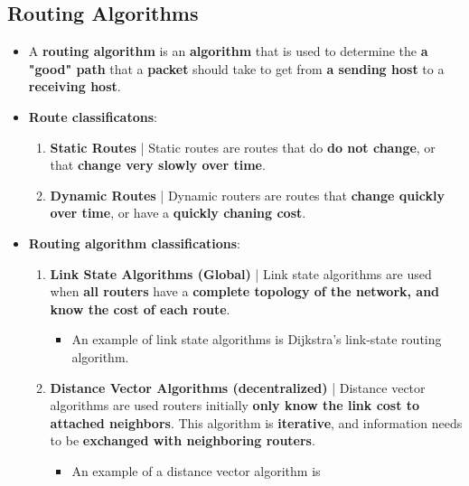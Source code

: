\documentclass{article}
\begin{document}
    \subsection*{Routing Algorithms}
    \begin{itemize}
        \item A \textbf{routing algorithm} is an \textbf{algorithm} that is used to determine the \textbf{a "good" path} that a \textbf{packet} should take to get from \textbf{a sending host} to a \textbf{receiving host}.
        \item \textbf{Route classificatons}:
        \begin{enumerate}
            \item \textbf{Static Routes} | Static routes are routes that do \textbf{do not change}, or that \textbf{change very slowly over time}.
            \item \textbf{Dynamic Routes} | Dynamic routers are routes that \textbf{change quickly over time}, or have a \textbf{quickly chaning cost}.
        \end{enumerate}
        \item \textbf{Routing algorithm classifications}:
        \begin{enumerate}
            \item \textbf{Link State Algorithms (Global)} | Link state algorithms are used when \textbf{all routers} have a \textbf{complete topology of the network, and know the cost of each route}.
            \begin{itemize}
                \item An example of link state algorithms is Dijkstra's link-state routing algorithm.
            \end{itemize}
            \item \textbf{Distance Vector Algorithms (decentralized)} | Distance vector algorithms are used routers initially \textbf{only know the link cost to attached neighbors}. This algorithm is \textbf{iterative}, and information needs to be \textbf{exchanged with neighboring routers}.
            \begin{itemize}
                \item An example of a distance vector algorithm is 
            \end{itemize}
        \end{enumerate}
    \end{itemize}
\end{document}
